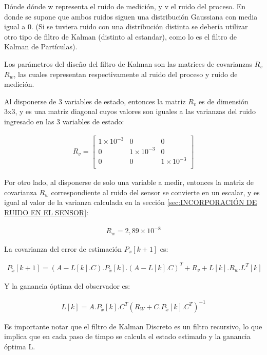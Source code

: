 \documentclass{article}
\begin{document}
\begin{sloppypar}
Dónde dónde w representa el ruido de medición, y v el ruido del proceso. En donde se supone que ambos ruidos siguen una distribución Gaussiana con media igual a 0. (Si se tuviera ruido con una distribución distinta se debería utilizar otro tipo de filtro de Kalman (distinto al estandar), como lo es el filtro de Kalman de Partículas).

Los parámetros del diseño del filtro de Kalman son las matrices de covarianzas $R_v$ $R_w$, las cuales representan respectivamente al ruido del proceso y ruido de medición.

Al disponerse de 3 variables de estado, entonces la matriz $R_v$ es de dimensión 3x3, y es una matriz diagonal cuyos valores son iguales a las varianzas del ruido ingresado en las 3 variables de estado:

\begin{align}
    R_v=\left[\begin{matrix}1\times{10}^{-3}&0&0\\0&1\times{10}^{-3}&0\\0&0&1\times{10}^{-3}\\\end{matrix}\right]
\end{align}

Por otro lado, al disponerse de solo una variable a medir, entonces la matriz de covarianza $R_w$ correspondiente al ruido del sensor se convierte en un escalar, y es igual al valor de la varianza calculada en la sección \ref{sec:INCORPORACIÓN DE RUIDO EN EL SENSOR}:

\begin{align}
    R_w=2,89\times10^{-8} %
\end{align}

La covarianza del error de estimación $P_{{x}}[k+1]$ es:

\begin{align}
    P_{\widetilde{x}}\left[k+1\right]=\left(A-L\left[k\right].C\right){.P}_{\widetilde{x}}\left[k\right].\left(A-L\left[k\right].C\right)^T+R_v+L\left[k\right].R_w.L^T\left[k\right]
\end{align}

Y la ganancia óptima del observador es:

\begin{align}
    L\left[k\right]=A{.P}_{\widetilde{x}}\left[k\right].C^T\left(R_W+C{.P}_{\widetilde{x}}\left[k\right].C^T\right)^{-1}
\end{align}

Es importante notar que el filtro de Kalman Discreto es un filtro recursivo, lo que implica que en cada paso de timpo se calcula el estado estimado y la ganancia óptima L.


\end{sloppypar}
\end{document}
